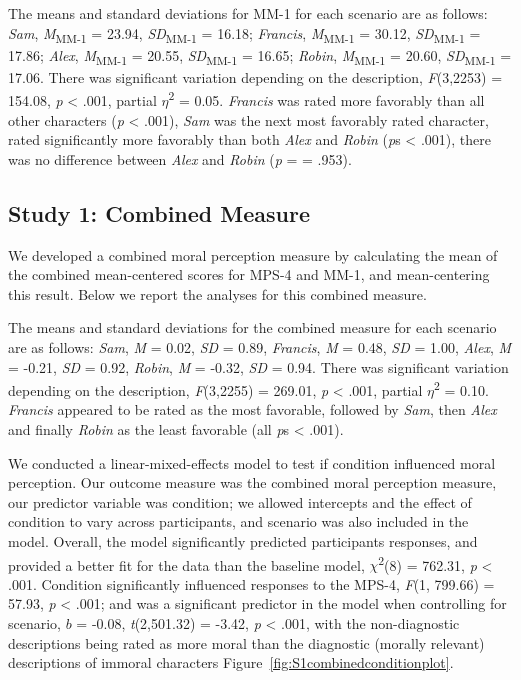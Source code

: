 \documentclass[
  man,floatsintext]{apa6}
\begin{document}
The means and standard deviations for MM-1 for each scenario are as follows:
\emph{Sam},
\emph{M}\textsubscript{MM-1} = 23.94, \emph{SD}\textsubscript{MM-1} = 16.18;
\emph{Francis},
\emph{M}\textsubscript{MM-1} = 30.12, \emph{SD}\textsubscript{MM-1} = 17.86;
\emph{Alex},
\emph{M}\textsubscript{MM-1} = 20.55, \emph{SD}\textsubscript{MM-1} = 16.65;
\emph{Robin},
\emph{M}\textsubscript{MM-1} = 20.60, \emph{SD}\textsubscript{MM-1} = 17.06. There was significant variation depending on the description, \emph{F}(3,2253) = 154.08, \emph{p} \textless{} .001, partial \(\eta\)\textsuperscript{2} = 0.05. \emph{Francis} was rated more favorably than all other characters (\emph{p} \textless{} .001), \emph{Sam} was the next most favorably rated character, rated significantly more favorably than both \emph{Alex} and \emph{Robin} (\emph{p}s \textless{} .001), there was no difference between \emph{Alex} and \emph{Robin} (\emph{p} = = .953).

\subsection{Study 1: Combined Measure}\label{study-1-combined-measure}

We developed a combined moral perception measure by calculating the mean of the combined mean-centered scores for MPS-4 and MM-1, and mean-centering this result. Below we report the analyses for this combined measure.

The means and standard deviations for the combined measure for each scenario are as follows:
\emph{Sam},
\emph{M} = 0.02, \emph{SD} = 0.89,
\emph{Francis},
\emph{M} = 0.48, \emph{SD} = 1.00,
\emph{Alex},
\emph{M} = -0.21, \emph{SD} = 0.92,
\emph{Robin},
\emph{M} = -0.32, \emph{SD} = 0.94. There was significant variation depending on the description, \emph{F}(3,2255) = 269.01, \emph{p} \textless{} .001, partial \(\eta\)\textsuperscript{2} = 0.10. \emph{Francis} appeared to be rated as the most favorable, followed by \emph{Sam}, then \emph{Alex} and finally \emph{Robin} as the least favorable (all \emph{p}s \textless{} .001).

We conducted a linear-mixed-effects model to test if condition influenced moral perception. Our outcome measure was the combined moral perception measure, our predictor variable was condition; we allowed intercepts and the effect of condition to vary across participants, and scenario was also included in the model.
Overall, the model significantly predicted participants responses, and provided a better fit for the data than the baseline model, \(\chi\)\textsuperscript{2}(8) = 762.31, \emph{p} \textless{} .001. Condition significantly influenced responses to the MPS-4, \emph{F}(1, 799.66) = 57.93, \emph{p} \textless{} .001; and was a significant predictor in the model when controlling for scenario, \(b\) = -0.08, \emph{t}(2,501.32) = -3.42, \emph{p} \textless{} .001, with the non-diagnostic descriptions being rated as more moral than the diagnostic (morally relevant) descriptions of immoral characters Figure~\ref{fig:S1combinedconditionplot}.
\end{document}
